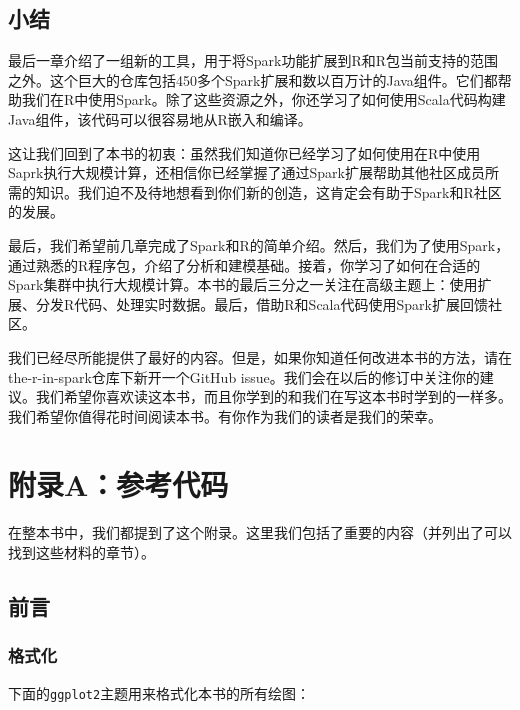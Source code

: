 \documentclass[
]{article}
\begin{document}
\hypertarget{ux5c0fux7ed3-11}{%
\subsection{小结}\label{ux5c0fux7ed3-11}}

最后一章介绍了一组新的工具，用于将Spark功能扩展到R和R包当前支持的范围之外。这个巨大的仓库包括450多个Spark扩展和数以百万计的Java组件。它们都帮助我们在R中使用Spark。除了这些资源之外，你还学习了如何使用Scala代码构建Java组件，该代码可以很容易地从R嵌入和编译。

这让我们回到了本书的初衷：虽然我们知道你已经学习了如何使用在R中使用Saprk执行大规模计算，还相信你已经掌握了通过Spark扩展帮助其他社区成员所需的知识。我们迫不及待地想看到你们新的创造，这肯定会有助于Spark和R社区的发展。

最后，我们希望前几章完成了Spark和R的简单介绍。然后，我们为了使用Spark，通过熟悉的R程序包，介绍了分析和建模基础。接着，你学习了如何在合适的Spark集群中执行大规模计算。本书的最后三分之一关注在高级主题上：使用扩展、分发R代码、处理实时数据。最后，借助R和Scala代码使用Spark扩展回馈社区。

我们已经尽所能提供了最好的内容。但是，如果你知道任何改进本书的方法，请在the-r-in-spark仓库下新开一个GitHub
issue。我们会在以后的修订中关注你的建议。我们希望你喜欢读这本书，而且你学到的和我们在写这本书时学到的一样多。我们希望你值得花时间阅读本书。有你作为我们的读者是我们的荣幸。

\hypertarget{ux9644ux5f55aux53c2ux8003ux4ee3ux7801}{%
\section{附录A：参考代码}\label{ux9644ux5f55aux53c2ux8003ux4ee3ux7801}}

在整本书中，我们都提到了这个附录。这里我们包括了重要的内容（并列出了可以找到这些材料的章节）。

\hypertarget{ux524dux8a00-1}{%
\subsection{前言}\label{ux524dux8a00-1}}

\hypertarget{ux683cux5f0fux5316-1}{%
\subsubsection{格式化}\label{ux683cux5f0fux5316-1}}

下面的\texttt{ggplot2}主题用来格式化本书的所有绘图：
\end{document}
